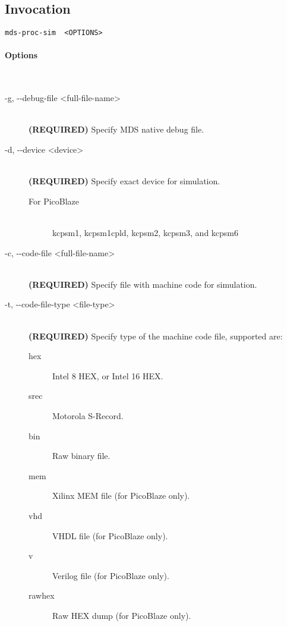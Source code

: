     \subsection{Invocation}
        \verb'mds-proc-sim  <OPTIONS>'

        \paragraph{Options}~\\
            \begin{description}
                \item[-g, -{}-debug-file <full-file-name>]~\\
                    \textbf{(REQUIRED)} Specify MDS native debug file.

                \item[-d, -{}-device <device>]~\\
                    \textbf{(REQUIRED)} Specify exact device for simulation.
                    \begin{description}
                        \item[For PicoBlaze]~\\
                            kcpsm1, kcpsm1cpld, kcpsm2, kcpsm3, and kcpsm6
                    \end{description}

                \item[-c, -{}-code-file <full-file-name>]~\\
                    \textbf{(REQUIRED)} Specify file with machine code for simulation.

                \item[-t, -{}-code-file-type <file-type>]~\\
                    \textbf{(REQUIRED)} Specify type of the machine code file, supported are:
                    \begin{description}
                        \item [hex] Intel 8 HEX, or Intel 16 HEX.
                        \item [srec] Motorola S-Record.
                        \item [bin] Raw binary file.
                        \item [mem] Xilinx MEM file (for PicoBlaze only).
                        \item [vhd] VHDL file (for PicoBlaze only).
                        \item [v] Verilog file (for PicoBlaze only).
                        \item [rawhex] Raw HEX dump (for PicoBlaze only).
                    \end{description}


\end{description}
